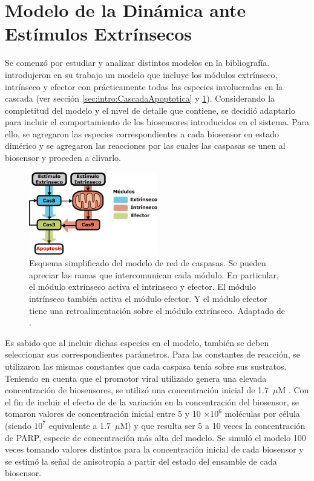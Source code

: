 \section{Modelo de la Dinámica ante Estímulos Extrínsecos}


Se comenzó por estudiar y analizar distintos modelos en la bibliografía. \cite{Albeck2008} introdujeron en su trabajo un modelo que incluye los módulos extrínseco, intrínseco y efector con prácticamente todas las especies involucradas en la cascada (ver sección \ref{sec:intro:CascadaApoptotica} y \cref{fig:sketch_2018}). Considerando la completitud del modelo y el nivel de detalle que contiene, se decidió adaptarlo para incluir el comportamiento de los biosensores introducidos en el sistema. Para ello, se agregaron las especies correspondientes a cada biosensor en estado dimérico y se agregaron las reacciones por las cuales las caspasas se unen al biosensor y proceden a clivarlo.

\begin{figure}[htb]
    \centering
    \includegraphics[width=0.5\textwidth]{img/cap_4/model_simplified_noCas9FB.pdf}
    \caption{\footnotesize{Esquema simplificado del modelo de red de caspasas. Se pueden apreciar las ramas que intercomunican cada módulo. En particular, el módulo extrínseco activa el intrínseco y efector. El módulo intrínseco también activa el módulo efector. Y el módulo efector tiene una retroalimentación sobre el módulo extrínseco. Adaptado de \cite{Corbat2021}.}}
    \label{fig:sketch_2018}
\end{figure}

Es sabido que al incluir dichas especies en el modelo, también se deben seleccionar sus correspondientes parámetros. Para las constantes de reacción, se utilizaron las mismas constantes que cada caspasa tenía sobre sus sustratos. Teniendo en cuenta que el promotor viral utilizado genera una elevada concentración de biosensores, se utilizó una concentración inicial de 1.7~$\mu$M \citep{Wachsmuth2015}. Con el fin de incluir el efecto de de la variación en la concentración del biosensor, se tomaron valores de concentración inicial entre 5 y 10 $ \times 10 ^6$ moléculas por célula (siendo $10^7$ equivalente a 1.7~$\mu$M) y que resulta ser 5 a 10 veces la concentración de PARP, especie de concentración más alta del modelo. Se simuló el modelo 100 veces tomando valores distintos para la concentración inicial de cada biosensor y se estimó la señal de anisotropía a partir del estado del ensamble de cada biosensor. 

